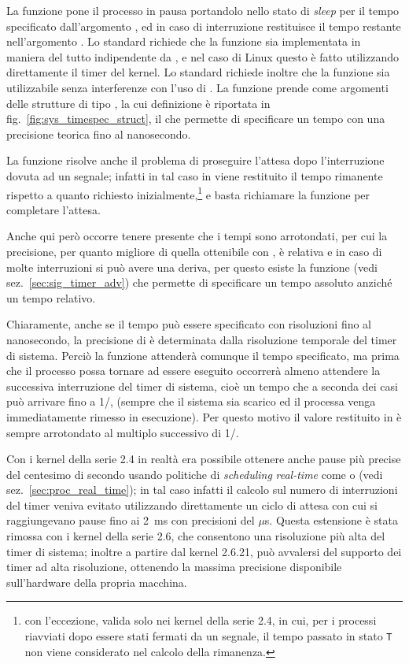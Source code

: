 La funzione pone il processo in pausa portandolo nello stato di \textit{sleep}
per il tempo specificato dall'argomento , ed in caso di
interruzione restituisce il tempo restante nell'argomento .  Lo
standard richiede che la funzione sia implementata in maniera del tutto
indipendente da , e nel caso di Linux questo è fatto utilizzando
direttamente il timer del kernel. Lo standard richiede inoltre che la funzione
sia utilizzabile senza interferenze con l'uso di . La funzione
prende come argomenti delle strutture di tipo , la cui
definizione è riportata in fig.~\ref{fig:sys_timespec_struct}, il che permette
di specificare un tempo con una precisione teorica fino al nanosecondo.

La funzione risolve anche il problema di proseguire l'attesa dopo
l'interruzione dovuta ad un segnale; infatti in tal caso in  viene
restituito il tempo rimanente rispetto a quanto richiesto
inizialmente,\footnote{con l'eccezione, valida solo nei kernel della serie
  2.4, in cui, per i processi riavviati dopo essere stati fermati da un
  segnale, il tempo passato in stato \texttt{T} non viene considerato nel
  calcolo della rimanenza.} e basta richiamare la funzione per completare
l'attesa.

Anche qui però occorre tenere presente che i tempi sono arrotondati, per cui
la precisione, per quanto migliore di quella ottenibile con , è
relativa e in caso di molte interruzioni si può avere una deriva, per questo
esiste la funzione  (vedi sez.~\ref{sec:sig_timer_adv})
che permette di specificare un tempo assoluto anziché un tempo relativo.

Chiaramente, anche se il tempo può essere specificato con risoluzioni fino al
nanosecondo, la precisione di  è determinata dalla risoluzione
temporale del timer di sistema. Perciò la funzione attenderà comunque il tempo
specificato, ma prima che il processo possa tornare ad essere eseguito
occorrerà almeno attendere la successiva interruzione del timer di sistema,
cioè un tempo che a seconda dei casi può arrivare fino a 1/, (sempre
che il sistema sia scarico ed il processa venga immediatamente rimesso in
esecuzione). Per questo motivo il valore restituito in  è sempre
arrotondato al multiplo successivo di 1/. 

Con i kernel della serie 2.4 in realtà era possibile ottenere anche pause più
precise del centesimo di secondo usando politiche di \textit{scheduling}
\textit{real-time} come  o  (vedi
sez.~\ref{sec:proc_real_time}); in tal caso infatti il calcolo sul numero di
interruzioni del timer veniva evitato utilizzando direttamente un ciclo di
attesa con cui si raggiungevano pause fino ai 2~ms con precisioni del
$\mu$s. Questa estensione è stata rimossa con i kernel della serie 2.6, che
consentono una risoluzione più alta del timer di sistema; inoltre a partire
dal kernel 2.6.21,  può avvalersi del supporto dei timer ad
alta risoluzione, ottenendo la massima precisione disponibile sull'hardware
della propria macchina.


